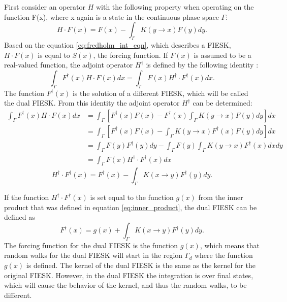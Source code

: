 First consider an operator $H$ with the following property when operating
on the function F(x), where x again is a state in the continuous phase space
$\Gamma$: 
\begin{equation}
  H \cdot F(x) = F(x) - \int_{\Gamma} K(y \to x)F(y)dy.
  \label{eq:forward_operator}
\end{equation}
Based on the equation \ref{eq:fredholm_int_eqn}, which describes a FIESK, 
$H \cdot F(x)$ is equal to $S(x)$, the forcing function. If $F(x)$ is assumed 
to be a real-valued function, the adjoint operator $H^{\dagger}$ is defined by 
the following identity \citep{morse_methods_1953}:
\begin{equation}
  \int_{\Gamma}F^{\dagger}(x)H \cdot F(x)dx  = 
  \int_{\Gamma}F(x)H^{\dagger} \cdot F^{\dagger}(x)dx.
  \label{eq:forward_adjoint_ops}
\end{equation}
The function $F^{\dagger}(x)$ is the solution of a different FIESK, which will
be called the dual FIESK. From this identity the adjoint operator 
$H^{\dagger}$ can be determined:
\begin{align}
  \int_{\Gamma} F^{\dagger}(x)H \cdot F(x)dx & = \int_{\Gamma} 
  \left[F^{\dagger}(x)F(x) -
  F^{\dagger}(x)\int_{\Gamma}K(y \to x)F(y)dy \right]dx \nonumber \\
  & = \int_{\Gamma} \left[F^{\dagger}(x)F(x) -
  \int_{\Gamma}K(y \to x)F^{\dagger}(x)F(y)dy \right]dx \nonumber \\
  & = \int_{\Gamma} F(y)F^{\dagger}(y)dy - 
  \int_{\Gamma}F(y)\int_{\Gamma}K(y \to x)F^{\dagger}(x)dxdy \nonumber \\
  & = \int_{\Gamma}F(x)H^{\dagger} \cdot F^{\dagger}(x)dx \nonumber
\end{align}
\begin{equation}
  H^{\dagger} \cdot F^{\dagger}(x) = F^{\dagger}(x) - 
  \int_{\Gamma}K(x \to y)F^{\dagger}(y)dy.
  \label{eq:adjoint_operator}
\end{equation}

If the function $H^{\dagger} \cdot F^{\dagger}(x)$ is set equal to the function
$g(x)$ from the inner product that was defined in equation 
\ref{eq:inner_product}, the dual FIESK can be defined as
\begin{equation}
  F^{\dagger}(x) = g(x) + \int_{\Gamma}K(x \to y)F^{\dagger}(y)dy.
  \label{eq:dual_fredholm_int_eqn}
\end{equation}
The forcing function for the dual FIESK is the function $g(x)$, which means
that random walks for the dual FIESK will start in the region $\Gamma_d$ where
the function $g(x)$ is defined. The kernel of the dual FIESK is the same as 
the kernel for the original FIESK. However, in the dual FIESK the integration 
is over final states, which will cause the behavior of the kernel, and thus
the random walks, to be different.

